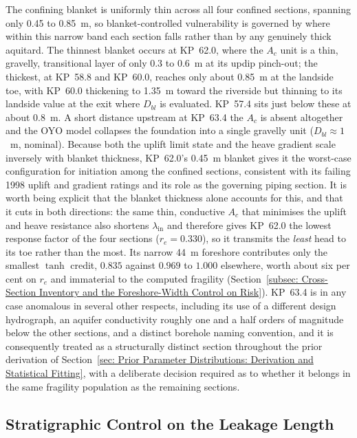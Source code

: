 The confining blanket is uniformly thin across all four confined sections, spanning only 0.45 to 0.85~m, so blanket-controlled vulnerability is governed by where within this narrow band each section falls rather than by any genuinely thick aquitard. The thinnest blanket occurs at KP~62.0, where the $A_c$ unit is a thin, gravelly, transitional layer of only 0.3 to 0.6~m at its updip pinch-out; the thickest, at KP~58.8 and KP~60.0, reaches only about 0.85~m at the landside toe, with KP~60.0 thickening to 1.35~m toward the riverside but thinning to its landside value at the exit where $D_{bl}$ is evaluated. KP~57.4 sits just below these at about 0.8~m. A short distance upstream at KP~63.4 the $A_c$ is absent altogether and the OYO model collapses the foundation into a single gravelly unit ($D_{bl} \approx 1$~m, nominal). Because both the uplift limit state and the heave gradient scale inversely with blanket thickness, KP~62.0's 0.45~m blanket gives it the worst-case configuration for initiation among the confined sections, consistent with its failing 1998 uplift and gradient ratings and its role as the governing piping section. It is worth being explicit that the blanket thickness alone accounts for this, and that it cuts in both directions: the same thin, conductive $A_c$ that minimises the uplift and heave resistance also shortens $\lambda_\mathrm{in}$ and therefore gives KP~62.0 the lowest response factor of the four sections ($r_e = 0.330$), so it transmits the \emph{least} head to its toe rather than the most. Its narrow 44~m foreshore contributes only the smallest $\tanh$ credit, $0.835$ against $0.969$ to $1.000$ elsewhere, worth about six per cent on $r_e$ and immaterial to the computed fragility (Section~\ref{subsec: Cross-Section Inventory and the Foreshore-Width Control on Risk}). KP~63.4 is in any case anomalous in several other respects, including its use of a different design hydrograph, an aquifer conductivity roughly one and a half orders of magnitude below the other sections, and a distinct borehole naming convention, and it is consequently treated as a structurally distinct section throughout the prior derivation of Section~\ref{sec: Prior Parameter Distributions: Derivation and Statistical Fitting}, with a deliberate decision required as to whether it belongs in the same fragility population as the remaining sections.

\subsection{Stratigraphic Control on the Leakage Length}
\label{subsec: Stratigraphic Control on the Leakage Length}

